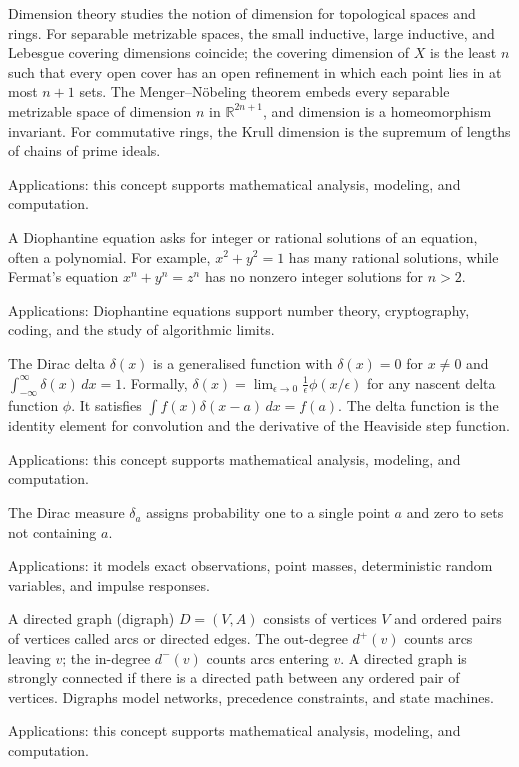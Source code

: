 Dimension theory studies the notion of dimension for topological spaces and rings. For separable metrizable spaces, the small inductive, large inductive, and Lebesgue covering dimensions coincide; the covering dimension of $X$ is the least $n$ such that every open cover has an open refinement in which each point lies in at most $n+1$ sets. The Menger--Nöbeling theorem embeds every separable metrizable space of dimension $n$ in $\mathbb{R}^{2n+1}$, and dimension is a homeomorphism invariant. For commutative rings, the Krull dimension is the supremum of lengths of chains of prime ideals. \par\noindent Applications: this concept supports mathematical analysis, modeling, and computation.

 A Diophantine equation asks for integer or rational solutions of an equation, often a polynomial. For example, $x^2+y^2=1$ has many rational solutions, while Fermat's equation $x^n+y^n=z^n$ has no nonzero integer solutions for $n>2$. \par\noindent Applications: Diophantine equations support number theory, cryptography, coding, and the study of algorithmic limits.

The Dirac delta $\delta(x)$ is a generalised function with $\delta(x) = 0$ for $x \neq 0$ and $\int_{-\infty}^{\infty} \delta(x)\,dx = 1$. Formally, $\delta(x) = \lim_{\epsilon \to 0} \frac{1}{\epsilon}\phi(x/\epsilon)$ for any nascent delta function $\phi$. It satisfies $\int f(x)\delta(x-a)\,dx = f(a)$. The delta function is the identity element for convolution and the derivative of the Heaviside step function. \par\noindent Applications: this concept supports mathematical analysis, modeling, and computation.

The Dirac measure $\delta_a$ assigns probability one to a single point $a$ and zero to sets not containing $a$. \par\noindent Applications: it models exact observations, point masses, deterministic random variables, and impulse responses.

A directed graph (digraph) $D = (V, A)$ consists of vertices $V$ and ordered pairs of vertices called arcs or directed edges. The out-degree $d^+(v)$ counts arcs leaving $v$; the in-degree $d^-(v)$ counts arcs entering $v$. A directed graph is strongly connected if there is a directed path between any ordered pair of vertices. Digraphs model networks, precedence constraints, and state machines. \par\noindent Applications: this concept supports mathematical analysis, modeling, and computation.

